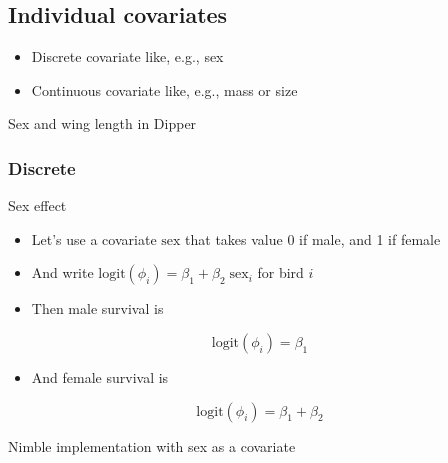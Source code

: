 \documentclass[
  12pt,
]{krantz}
\providecommand{\tightlist}{%
  \setlength{\itemsep}{0pt}\setlength{\parskip}{0pt}}
\begin{document}
\hypertarget{individual-covariates}{%
\subsection{Individual covariates}\label{individual-covariates}}

\begin{itemize}
\item
  Discrete covariate like, e.g., sex
\item
  Continuous covariate like, e.g., mass or size
\end{itemize}

Sex and wing length in Dipper

\hypertarget{discrete-1}{%
\subsubsection{Discrete}\label{discrete-1}}

Sex effect

\begin{itemize}
\item
  Let's use a covariate \(\text{sex}\) that takes value 0 if male, and 1 if female
\item
  And write \(\text{logit}(\phi_i) = \beta_1 + \beta_2 \; \text{sex}_i\) for bird \(i\)
\item
  Then male survival is
\end{itemize}

\[\text{logit}(\phi_i) = \beta_1\]

\begin{itemize}
\tightlist
\item
  And female survival is
\end{itemize}

\[\text{logit}(\phi_i) = \beta_1 + \beta_2\]

Nimble implementation with sex as a covariate
\end{document}
